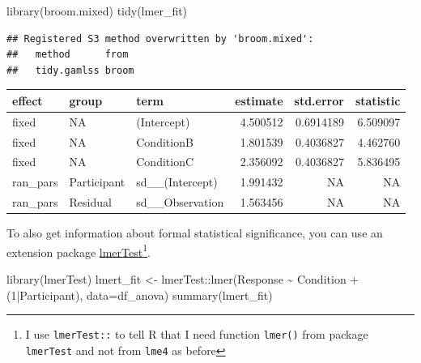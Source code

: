 \documentclass[
]{book}
\newenvironment{Shaded}{\begin{snugshade}}{\end{snugshade}}
\newcommand{\AttributeTok}[1]{\textcolor[rgb]{0.77,0.63,0.00}{#1}}
\newcommand{\DecValTok}[1]{\textcolor[rgb]{0.00,0.00,0.81}{#1}}
\newcommand{\FunctionTok}[1]{\textcolor[rgb]{0.00,0.00,0.00}{#1}}
\newcommand{\NormalTok}[1]{#1}
\newcommand{\OtherTok}[1]{\textcolor[rgb]{0.56,0.35,0.01}{#1}}
\newcommand{\SpecialCharTok}[1]{\textcolor[rgb]{0.00,0.00,0.00}{#1}}
\begin{document}
\begin{Shaded}
\begin{Highlighting}[]
\FunctionTok{library}\NormalTok{(broom.mixed)}
\FunctionTok{tidy}\NormalTok{(lmer\_fit)}
\end{Highlighting}
\end{Shaded}

\begin{verbatim}
## Registered S3 method overwritten by 'broom.mixed':
##   method      from 
##   tidy.gamlss broom
\end{verbatim}

\begin{tabular}{l|l|l|r|r|r}
\hline
effect & group & term & estimate & std.error & statistic\\
\hline
fixed & NA & (Intercept) & 4.500512 & 0.6914189 & 6.509097\\
\hline
fixed & NA & ConditionB & 1.801539 & 0.4036827 & 4.462760\\
\hline
fixed & NA & ConditionC & 2.356092 & 0.4036827 & 5.836495\\
\hline
ran\_pars & Participant & sd\_\_(Intercept) & 1.991432 & NA & NA\\
\hline
ran\_pars & Residual & sd\_\_Observation & 1.563456 & NA & NA\\
\hline
\end{tabular}

To also get information about formal statistical significance, you can use an extension package \href{https://github.com/runehaubo/lmerTestR}{lmerTest}\footnote{I use \texttt{lmerTest::} to tell R that I need function \texttt{lmer()} from package \texttt{lmerTest} and not from \texttt{lme4} as before}.

\begin{Shaded}
\begin{Highlighting}[]
\FunctionTok{library}\NormalTok{(lmerTest)}
\NormalTok{lmert\_fit }\OtherTok{\textless{}{-}}\NormalTok{ lmerTest}\SpecialCharTok{::}\FunctionTok{lmer}\NormalTok{(Response }\SpecialCharTok{\textasciitilde{}}\NormalTok{ Condition }\SpecialCharTok{+}\NormalTok{ (}\DecValTok{1}\SpecialCharTok{|}\NormalTok{Participant), }\AttributeTok{data=}\NormalTok{df\_anova)}
\FunctionTok{summary}\NormalTok{(lmert\_fit)}
\end{Highlighting}
\end{Shaded}
\end{document}
